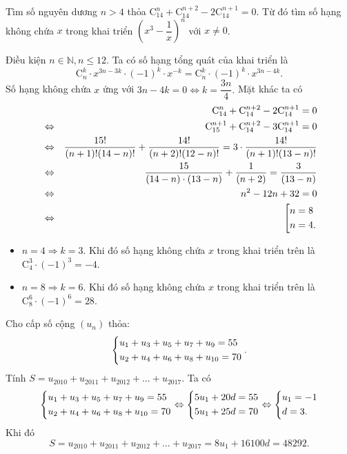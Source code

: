 \begin{bt}%
	Tìm số nguyên dương $n>4$ thỏa $\mathrm{C}^n_{14}+\mathrm{C}^{n+2}_{14}-2\mathrm{C}^{n+1}_{14}=0$. Từ đó tìm số hạng không chứa $x$ trong khai triển $\left(x^3-\dfrac{1}{x}\right)^n$ với $x\ne 0$.
	\loigiai
	{
	Điều kiện $n\in\mathbb{N},n\leq 12$.
	Ta có số hạng tổng quát của khai triển là $$\mathrm{C}^k_{n}\cdot x^{3n-3k}\cdot (-1)^k\cdot x^{-k}=\mathrm{C}^k_n\cdot (-1)^k\cdot x^{3n-4k}.$$
	Số hạng không chứa $x$ ứng với $3n-4k=0\Leftrightarrow k=\dfrac{3n}{4}.$
	Mặt khác ta có
	\begin{eqnarray*}
	& &\mathrm{C}^n_{14}+\mathrm{C}^{n+2}_{14}-2\mathrm{C}^{n+1}_{14}=0\\
	&\Leftrightarrow&\mathrm{C}^{n+1}_{15}+\mathrm{C}^{n+2}_{14}-3\mathrm{C}^{n+1}_{14}=0\\ &\Leftrightarrow&\dfrac{15!}{(n+1)!(14-n)!}+\dfrac{14!}{(n+2)!(12-n)!}=3\cdot\dfrac{14!}{(n+1)!(13-n)!}\\
	&\Leftrightarrow&\dfrac{15}{(14-n)\cdot(13-n)}+\dfrac{1}{(n+2)}=\dfrac{3}{(13-n)}\\
	&\Leftrightarrow& n^2-12n+32=0\\
	&\Leftrightarrow&\left[\begin{aligned}&n=8\\&n=4.\end{aligned}\right.
	\end{eqnarray*}
	\begin{itemize}
		\item $n=4\Rightarrow k=3$. Khi đó số hạng không chứa $x$ trong khai triển trên là $\mathrm{C}^3_4\cdot(-1)^3=-4$.
		\item $n=8\Rightarrow k=6$. Khi đó số hạng không chứa $x$ trong khai triển trên là $\mathrm{C}^6_8\cdot(-1)^6=28$.
	\end{itemize}
	}
	
\end{bt}

\begin{bt}%
	Cho cấp số cộng $(u_n)$ thỏa:
	$$\left\{\begin{aligned}&u_1+u_3+u_5+u_7+u_9=55\\&u_2+u_4+u_6+u_8+u_{10}=70\end{aligned}\right..$$
	Tính $S=u_{2010}+u_{2011}+u_{2012}+\dots+u_{2017}$.
	\loigiai
	{
	Ta có
		$$\left\{\begin{aligned}&u_1+u_3+u_5+u_7+u_9=55\\&u_2+u_4+u_6+u_8+u_{10}=70\end{aligned}\right.\Leftrightarrow\left\{\begin{aligned}&5u_1+20d=55\\&5u_1+25d=70\end{aligned}\right.\Leftrightarrow\left\{\begin{aligned}&u_1=-1\\&d=3.\end{aligned}\right.$$
	Khi đó 
	$$S=u_{2010}+u_{2011}+u_{2012}+\dots+u_{2017}=8u_1+16100d=48292.$$
	}

\end{bt}

